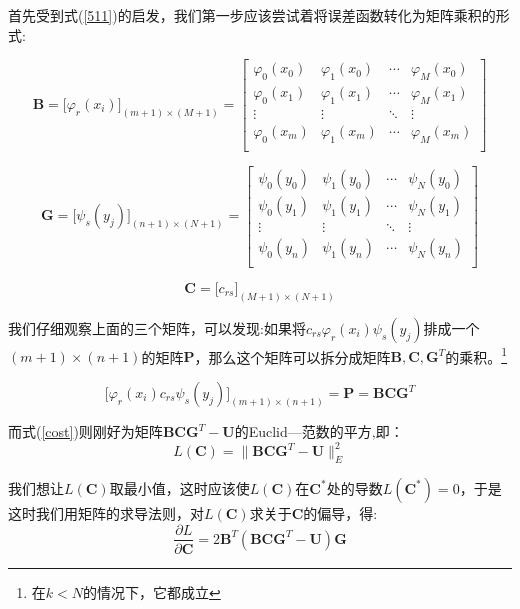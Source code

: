 首先受到式(\ref{511})的启发，我们第一步应该尝试着将误差函数转化为矩阵乘积的形式:

\[\bm{B} =\big[\varphi_{r}(x_i)\big]_{(m+1)\times (M+1)}=
\begin{bmatrix}
{\varphi_{0}(x_0)}&{\varphi_{1}(x_0)}& \cdots &{\varphi_{M}(x_0)}\\
{\varphi_{0}(x_1)}&{\varphi_{1}(x_1)}& \cdots &{\varphi_{M}(x_1)}\\
 \vdots & \vdots & \ddots & \vdots \\
{\varphi_{0}(x_m)}&{\varphi_{1}(x_m)}& \cdots &{\varphi_{M}(x_m)}\\
\end{bmatrix}\]

\[\bm{G} =\big[\psi_{s}(y_j)\big]_{(n+1)\times (N+1)}=
\begin{bmatrix}
{\psi_{0}(y_0)}&{\psi_{1}(y_0)}& \cdots &{\psi_{N}(y_0)}\\
{\psi_{0}(y_1)}&{\psi_{1}(y_1)}& \cdots &{\psi_{N}(y_1)}\\
 \vdots & \vdots & \ddots & \vdots \\
{\psi_{0}(y_n)}&{\psi_{1}(y_n)}& \cdots &{\psi_{N}(y_n)}\\
\end{bmatrix}\]

\[\bm{C} =\big[c_{rs}\big]_{(M+1)\times (N+1)}\]

我们仔细观察上面的三个矩阵，可以发现:如果将$c_{rs}\varphi_{r}(x_i)\psi_{s}(y_j)$排成一个$(m+1)\times (n+1)$的矩阵$\bm{P}$，那么这个矩阵可以拆分成矩阵$\bm{B},\bm{C},\bm{G}^T$的乘积。\footnote{在$k<N$的情况下，它都成立}


\begin{equation}
\label{51}
\Big[\varphi_{r}(x_i)c_{rs}\psi_{s}(y_j) \Big]_{(m+1)\times (n+1)}=\bm{P}=\bm{B}\bm{C}\bm{G}^T
\end{equation}


而式(\ref{cost})则刚好为矩阵$\bm{B}\bm{C}\bm{G}^T-\bm{U}$的Euclid---范数的平方,即：
\begin{equation}
L(\bm{C})={\|{\bm{B}\bm{C}\bm{G}^T-\bm{U}}\|_{E}^2}
\end{equation}

我们想让$L(\bm{C})$取最小值，这时应该使$L(\bm{C})$在$\bm{C}^{\ast}$处的导数$L(\bm{C}^{\ast})=0$，于是
这时我们用矩阵的求导法则，对$L(\bm{C})$求关于$\bm{C}$的偏导，得:
\begin{equation}
\label{lc}
\boxed{
\dfrac{\partial L}{\partial \bm{C}}=2\bm{B}^T(\bm{B}\bm{C}\bm{G}^T-\bm{U})\bm{G}}
\end{equation}




